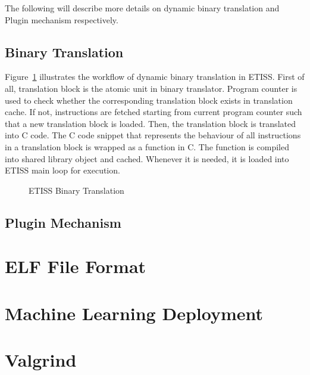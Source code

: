 The following will describe more details on dynamic binary translation and Plugin mechanism respectively.

\subsection{Binary Translation}
Figure~\ref{fig:etiss_binary_translation} illustrates the workflow of dynamic binary translation in ETISS.
First of all, translation block is the atomic unit in binary translator. Program counter is used to check whether the corresponding translation block exists in translation cache.
If not, instructions are fetched starting from current program counter such that a new translation block is loaded. Then, the translation block is translated into C code.
The C code snippet that represents the behaviour of all instructions in a translation block is wrapped as a function in C. The function is compiled into shared library object and cached.
Whenever it is needed, it is loaded into ETISS main loop for execution. 


\begin{figure}[htbp]
    \caption{ETISS Binary Translation}
    \label{fig:etiss_binary_translation}
\end{figure}

\subsection{Plugin Mechanism}

\section{ELF File Format}
\section{Machine Learning Deployment}
\section{Valgrind}